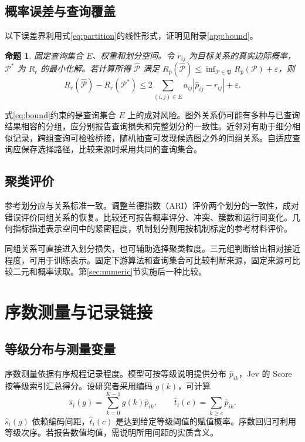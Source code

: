 \documentclass[UTF8,a4paper,zihao=-4,fontset=fandol]{ctexart}
\newtheorem{proposition}{命题}
\begin{document}
\subsection{概率误差与查询覆盖}

以下误差界利用式\eqref{eq:partition}的线性形式，证明见附录\ref{app:bound}。

\begin{proposition}\label{prop:bound}
固定查询集合 $E$、权重和划分空间。令 $r_{ij}$ 为目标关系的真实边际概率，$\mathcal P^*$ 为 $R_r$ 的最小化解。若计算所得 $\widehat{\mathcal P}$ 满足
$R_{\widehat p}(\widehat{\mathcal P})\leq\inf_{\mathcal P\in\mathfrak P}R_{\widehat p}(\mathcal P)+\varepsilon$，则
\begin{equation}
 R_r(\widehat{\mathcal P})-R_r(\mathcal P^*)
 \leq 2\sum_{(i,j)\in E}a_{ij}|\widehat p_{ij}-r_{ij}|+\varepsilon.
 \label{eq:bound}
\end{equation}
\end{proposition}

式\eqref{eq:bound}约束的是查询集合 $E$ 上的成对风险。图外关系仍可能有多种与已查询结果相容的分组，应分别报告查询损失和完整划分的一致性。近邻对有助于细分相似记录，跨组查询可检验桥接，随机抽查可发现候选图之外的同组关系。自适应查询应保存选择路径，比较来源时采用共同的查询集合。

\subsection{聚类评价}

参考划分应与关系标准一致。调整兰德指数（ARI）评价两个划分的一致性，成对错误评价同组关系的恢复\citep{hubert1985}。比较还可报告概率评分、冲突、簇数和运行间变化。几何指标描述表示空间中的紧密程度，机制划分则用按机制标定的参考材料评价。

同组关系可直接进入划分损失，也可辅助选择聚类粒度。三元组判断给出相对接近程度，可用于训练表示。固定下游算法和查询集合可比较判断来源，固定来源可比较二元和概率读取。第\ref{sec:numeric}节实施后一种比较。

\section{序数测量与记录链接}\label{sec:extensions}

\subsection{等级分布与测量变量}

序数测量依据有序规程记录程度。模型可按等级说明提供分布 $\widehat p_{ik}$，Jev 的 Score 按等级索引汇总得分\citep{typesafe-score}。设研究者采用编码 $g(k)$，可计算
\begin{equation}
 \widehat s_i(g)=\sum_{k=0}^{K-1}g(k)\widehat p_{ik},\qquad
 \widehat t_i(c)=\sum_{k\geq c}\widehat p_{ik}.
 \label{eq:ordinal}
\end{equation}
$\widehat s_i(g)$ 依赖编码间距，$\widehat t_i(c)$ 是达到给定等级阈值的赋值概率。序数回归可利用等级次序\citep{mccullagh1980}。若报告数值均值，需说明所用间距的实质含义。
\end{document}
